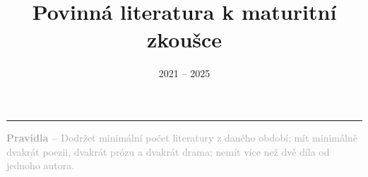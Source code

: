 \documentclass{extarticle} %
\author{\theauthor}
\title{Povinná literatura k maturitní zkoušce}
\date{2021 -- 2025}
\begin{document}
\changefontsize{7pt}


\tableofcontents

\vfill\noindent\begin{minipage}{\textwidth}
    \textcolor{darkgray}{\rule{\linewidth}{0.4pt}
    \footnotesize\textbf{Pravidla --} Dodržet minimální počet literatury z daného období;
    mít minimálně dvakrát poezii, dvakrát prózu a dvakrát drama;
    nemít více než dvě díla od jednoho autora.}
\end{minipage}

\newpage

\end{document}
